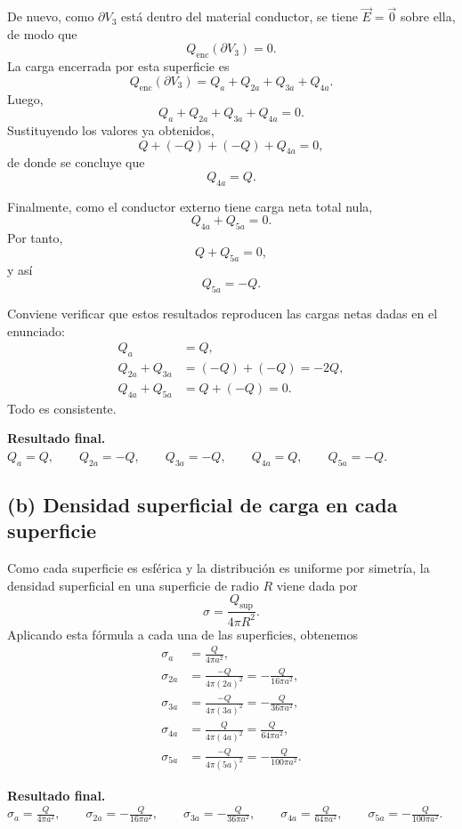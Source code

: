 \documentclass[11pt]{article}
\newcommand{\resultadofinal}[1]{%
  \par\medskip
  \noindent\textbf{Resultado final.} #1\par
}
\begin{document}
De nuevo, como $\partial V_3$ está dentro del material conductor, se tiene $\vec E=\vec 0$ sobre ella, de modo que
\begin{equation*}
Q_{\mathrm{enc}}(\partial V_3)=0.
\end{equation*}
La carga encerrada por esta superficie es
\begin{equation*}
Q_{\mathrm{enc}}(\partial V_3)=Q_a+Q_{2a}+Q_{3a}+Q_{4a}.
\end{equation*}
Luego,
\begin{equation*}
Q_a+Q_{2a}+Q_{3a}+Q_{4a}=0.
\end{equation*}
Sustituyendo los valores ya obtenidos,
\begin{equation*}
Q+(-Q)+(-Q)+Q_{4a}=0,
\end{equation*}
de donde se concluye que
\begin{equation*}
\boxed{Q_{4a}=Q.}
\end{equation*}

Finalmente, como el conductor externo tiene carga neta total nula,
\begin{equation*}
Q_{4a}+Q_{5a}=0.
\end{equation*}
Por tanto,
\begin{equation*}
Q+Q_{5a}=0,
\end{equation*}
y así
\begin{equation*}
\boxed{Q_{5a}=-Q.}
\end{equation*}

Conviene verificar que estos resultados reproducen las cargas netas dadas en el enunciado:
\begin{align*}
Q_a &= Q,\\
Q_{2a}+Q_{3a} &= (-Q)+(-Q)=-2Q,\\
Q_{4a}+Q_{5a} &= Q+(-Q)=0.
\end{align*}
Todo es consistente.

\resultadofinal{$\boxed{Q_a=Q,\qquad Q_{2a}=-Q,\qquad Q_{3a}=-Q,\qquad Q_{4a}=Q,\qquad Q_{5a}=-Q.}$}

\subsection*{(b) Densidad superficial de carga en cada superficie}

Como cada superficie es esférica y la distribución es uniforme por simetría, la densidad superficial en una superficie de radio $R$ viene dada por
\begin{equation*}
\sigma=\frac{Q_{\mathrm{sup}}}{4\pi R^2}.
\end{equation*}
Aplicando esta fórmula a cada una de las superficies, obtenemos
\begin{align*}
\sigma_a &= \frac{Q}{4\pi a^2},\\
\sigma_{2a} &= \frac{-Q}{4\pi(2a)^2}=-\frac{Q}{16\pi a^2},\\
\sigma_{3a} &= \frac{-Q}{4\pi(3a)^2}=-\frac{Q}{36\pi a^2},\\
\sigma_{4a} &= \frac{Q}{4\pi(4a)^2}=\frac{Q}{64\pi a^2},\\
\sigma_{5a} &= \frac{-Q}{4\pi(5a)^2}=-\frac{Q}{100\pi a^2}.
\end{align*}

\resultadofinal{$\boxed{\sigma_a = \frac{Q}{4\pi a^2}, \qquad
\sigma_{2a} = -\frac{Q}{16\pi a^2}, \qquad
\sigma_{3a} = -\frac{Q}{36\pi a^2}, \qquad
\sigma_{4a} = \frac{Q}{64\pi a^2}, \qquad
\sigma_{5a} = -\frac{Q}{100\pi a^2}.}$}
\end{document}
